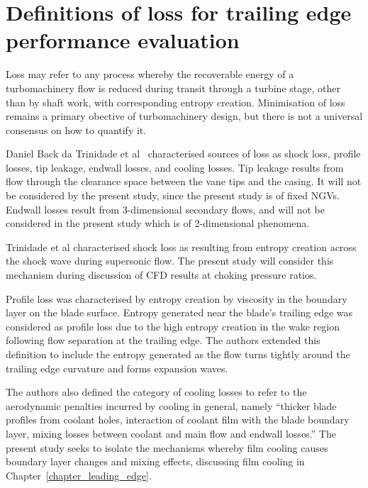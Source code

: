 \documentclass[a4paper, 11pt, oneside]{report}
\begin{document}
\section{Definitions of loss for trailing edge performance evaluation}

Loss may refer to any process whereby the recoverable energy of a turbomachinery flow is reduced during transit through a turbine stage, other than by shaft work, with corresponding entropy creation. Minimisation of loss remains a primary obective of turbomachinery design, but there is not a universal consensus on how to quantify it.

Daniel Back da Trinidade et al~\cite{trinidade_loss} characterised sources of loss as shock loss, profile losses, tip leakage, endwall losses, and cooling losses. Tip leakage results from flow through the clearance space between the vane tips and the casing. It will not be considered by the present study, since the present study is of fixed NGVs. Endwall losses result from 3-dimensional secondary flows, and will not be considered in the present study which is of 2-dimensional phenomena.

Trinidade et al characterised shock loss as resulting from entropy creation across the shock wave during supersonic flow. The present study will consider this mechanism during discussion of CFD results at choking pressure ratios.

Profile loss was characterised by entropy creation by viscosity in the boundary layer on the blade surface. Entropy generated near the blade's trailing edge was considered as profile loss due to the high entropy creation in the wake region following flow separation at the trailing edge. The authors extended this definition to include the entropy generated as the flow turns tightly around the trailing edge curvature and forms expansion waves.

The authors also defined the category of cooling losses to refer to the aerodynamic penalties incurred by cooling in general, namely ``thicker blade profiles from coolant holes, interaction of coolant film with the blade boundary layer, mixing losses between coolant and main flow and endwall losses.'' The present study seeks to isolate the mechanisms whereby film cooling causes boundary layer changes and mixing effects, discussing film cooling in Chapter~\ref{chapter_leading_edge}.
\end{document}
